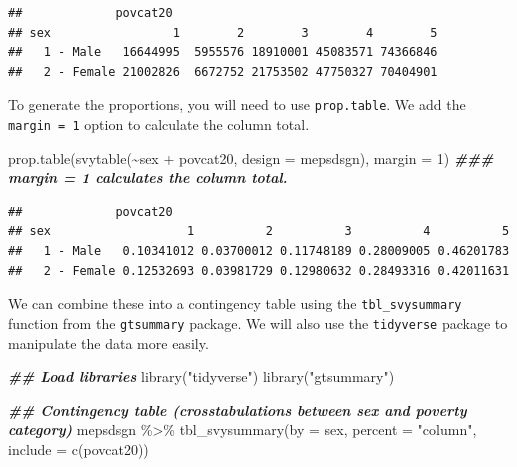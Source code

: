 \documentclass[
]{book}
\newenvironment{Shaded}{\begin{snugshade}}{\end{snugshade}}
\newcommand{\AttributeTok}[1]{\textcolor[rgb]{0.77,0.63,0.00}{#1}}
\newcommand{\DecValTok}[1]{\textcolor[rgb]{0.00,0.00,0.81}{#1}}
\newcommand{\DocumentationTok}[1]{\textcolor[rgb]{0.56,0.35,0.01}{\textbf{\textit{#1}}}}
\newcommand{\FunctionTok}[1]{\textcolor[rgb]{0.00,0.00,0.00}{#1}}
\newcommand{\NormalTok}[1]{#1}
\newcommand{\SpecialCharTok}[1]{\textcolor[rgb]{0.00,0.00,0.00}{#1}}
\newcommand{\StringTok}[1]{\textcolor[rgb]{0.31,0.60,0.02}{#1}}
\theoremstyle{definition}
\theoremstyle{definition}
\theoremstyle{definition}
\theoremstyle{definition}
\theoremstyle{remark}
\begin{document}
\begin{verbatim}
##             povcat20
## sex                 1        2        3        4        5
##   1 - Male   16644995  5955576 18910001 45083571 74366846
##   2 - Female 21002826  6672752 21753502 47750327 70404901
\end{verbatim}

To generate the proportions, you will need to use \texttt{prop.table}. We add the \texttt{margin\ =\ 1} option to calculate the column total.

\begin{Shaded}
\begin{Highlighting}[]
\FunctionTok{prop.table}\NormalTok{(}\FunctionTok{svytable}\NormalTok{(}\SpecialCharTok{\textasciitilde{}}\NormalTok{sex }\SpecialCharTok{+}\NormalTok{ povcat20, }\AttributeTok{design =}\NormalTok{ mepsdsgn), }\AttributeTok{margin =} \DecValTok{1}\NormalTok{) }\DocumentationTok{\#\#\# margin = 1 calculates the column total.}
\end{Highlighting}
\end{Shaded}

\begin{verbatim}
##             povcat20
## sex                   1          2          3          4          5
##   1 - Male   0.10341012 0.03700012 0.11748189 0.28009005 0.46201783
##   2 - Female 0.12532693 0.03981729 0.12980632 0.28493316 0.42011631
\end{verbatim}

We can combine these into a contingency table using the \texttt{tbl\_svysummary} function from the \texttt{gtsummary} package. We will also use the \texttt{tidyverse} package to manipulate the data more easily.

\begin{Shaded}
\begin{Highlighting}[]
\DocumentationTok{\#\# Load libraries }
\FunctionTok{library}\NormalTok{(}\StringTok{"tidyverse"}\NormalTok{)}
\FunctionTok{library}\NormalTok{(}\StringTok{"gtsummary"}\NormalTok{)}

\DocumentationTok{\#\# Contingency table (crosstabulations between sex and poverty category)}
\NormalTok{mepsdsgn }\SpecialCharTok{\%\textgreater{}\%}
  \FunctionTok{tbl\_svysummary}\NormalTok{(}\AttributeTok{by =}\NormalTok{ sex, }\AttributeTok{percent =} \StringTok{"column"}\NormalTok{, }\AttributeTok{include =} \FunctionTok{c}\NormalTok{(povcat20))}
\end{Highlighting}
\end{Shaded}
\end{document}
